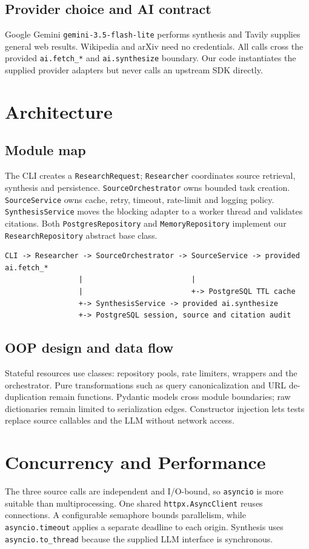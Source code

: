 \documentclass[11pt,a4paper]{article}
\begin{document}
\subsection{Provider choice and AI contract}
Google Gemini \texttt{gemini-3.5-flash-lite} performs synthesis and Tavily supplies general web results. Wikipedia
and arXiv need no credentials. All calls cross the provided \texttt{ai.fetch\_*} and
\texttt{ai.synthesize} boundary. Our code instantiates the supplied provider adapters but never
calls an upstream SDK directly.

\section{Architecture}
\subsection{Module map}
The CLI creates a \texttt{ResearchRequest}; \texttt{Researcher} coordinates source retrieval,
synthesis and persistence. \texttt{SourceOrchestrator} owns bounded task creation.
\texttt{SourceService} owns cache, retry, timeout, rate-limit and logging policy.
\texttt{SynthesisService} moves the blocking adapter to a worker thread and validates citations.
Both \texttt{PostgresRepository} and \texttt{MemoryRepository} implement our
\texttt{ResearchRepository} abstract base class.

\begin{verbatim}
CLI -> Researcher -> SourceOrchestrator -> SourceService -> provided ai.fetch_*
                 |                         |
                 |                         +-> PostgreSQL TTL cache
                 +-> SynthesisService -> provided ai.synthesize
                 +-> PostgreSQL session, source and citation audit
\end{verbatim}

\subsection{OOP design and data flow}
Stateful resources use classes: repository pools, rate limiters, wrappers and the orchestrator.
Pure transformations such as query canonicalization and URL de-duplication remain functions.
Pydantic models cross module boundaries; raw dictionaries remain limited to serialization edges.
Constructor injection lets tests replace source callables and the LLM without network access.

\section{Concurrency and Performance}
The three source calls are independent and I/O-bound, so \texttt{asyncio} is more suitable than
multiprocessing. One shared \texttt{httpx.AsyncClient} reuses connections. A configurable semaphore
bounds parallelism, while \texttt{asyncio.timeout} applies a separate deadline to each origin.
Synthesis uses \texttt{asyncio.to\_thread} because the supplied LLM interface is synchronous.
\end{document}
